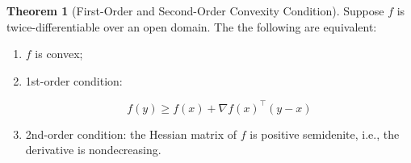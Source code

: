 \documentclass[12pt]{article} %
\theoremstyle{definition}
\newtheorem{theorem}{Theorem}
\begin{document}
\begin{theorem}[First-Order and Second-Order Convexity Condition]
	Suppose $f$ is twice-differentiable over an open domain. The the following are equivalent:
	
	\begin{enumerate}
		\item $f$ is convex;

		\item 1st-order condition:

		\begin{ceqn}
			\begin{equation}
				f(y) \ge f(x) + \nabla f(x)^\intercal (y - x) 
				\label{eq:convex function prop}
			\end{equation}
		\end{ceqn}

		\item 2nd-order condition: the Hessian matrix of $f$ is positive semidenite, i.e., the derivative is nondecreasing. 
	\end{enumerate}
\end{theorem}
\end{document}
